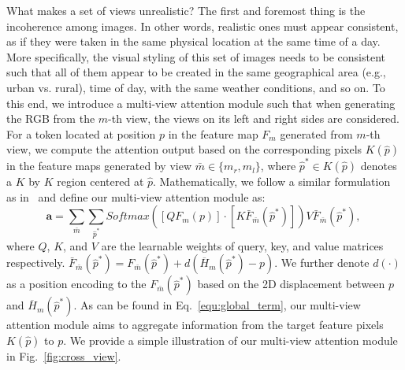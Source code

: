  What makes a set of views unrealistic? The first and foremost thing is the incoherence among images. In other words, realistic ones must appear consistent, as if they were taken in the same physical location at the same time of a day. More specifically, the visual styling of this set of images needs to be consistent such that all of them appear to be created in the same geographical area (e.g., urban vs. rural), time of day, with the same weather conditions, and so on. To this end, we introduce a multi-view attention module such that when generating the RGB from the $m$-th view, the views on its left and right sides 
are considered. For a token located at position $p$ in the feature
map $F_m$ generated from $m$-th view, we compute the attention output based on the corresponding pixels $K(\hat{p})$ in the feature maps generated by view $\bar{m}\in\{m_r,m_l\}$, where $\hat{p}^*\in K(\hat{p})$ denotes a $K$ by $K$ region centered at $\hat{p}$. Mathematically, we follow a similar formulation as in~\cite{vaswani2017attention} and define our multi-view attention module as:
\begin{equation} 
\mathbf{a}=\sum_{\bar{m}}\sum_{\hat{p}^*}Softmax(\left[Q F_m(p)\right]\cdot\left[K\bar{F}_{\bar{m}}(\hat{p}^*)\right]) V\bar{F}_{\bar{m}}(\hat{p}^*),~\label{equ:global_term}
\end{equation}
where $Q$, $K$, and $V$ are the learnable weights of query, key, and value matrices respectively. $\bar{F}_{\bar{m}}(\hat{p}^*)=F_{\bar{m}}(\hat{p}^*)+d(\overline{H}_m(\hat{p}^*)-p)$. We further denote $d(\cdot)$ as a position encoding to the $F_{\bar{m}}(\hat{p}^*)$ based on the 2D displacement between $p$ and $\overline{H}_m(\hat{p}^*)$. As can be found in Eq.~\ref{equ:global_term}, our multi-view attention module aims to aggregate information from the target feature pixels $K(\hat{p})$ to $p$. We provide a simple illustration of our multi-view attention module in Fig.~\ref{fig:cross_view}.

